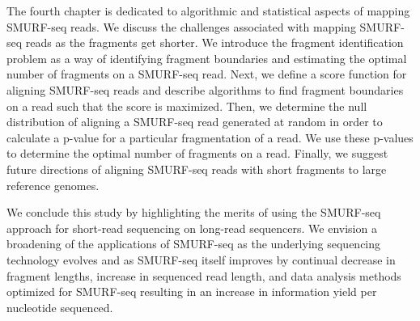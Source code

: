 The fourth chapter is dedicated to algorithmic and statistical aspects
of mapping SMURF-seq reads. We discuss the challenges associated with
mapping SMURF-seq reads as the fragments get shorter.
%
We introduce the fragment identification problem as a way of identifying
fragment boundaries and estimating the optimal number of fragments on a
SMURF-seq read.
%
Next, we define a score function for aligning SMURF-seq reads and
describe algorithms to find fragment boundaries on a read such that the
score is maximized.
%
Then, we determine the null distribution of aligning a SMURF-seq read
generated at random in order to calculate a p-value for a particular
fragmentation of a read. We use these p-values to determine the optimal
number of fragments on a read.
%
Finally, we suggest future directions of aligning SMURF-seq reads with
short fragments to large reference genomes.

We conclude this study by highlighting the merits of using the SMURF-seq
approach for short-read sequencing on long-read sequencers. We envision
a broadening of the applications of SMURF-seq as the underlying
sequencing technology evolves and as SMURF-seq itself improves by
continual decrease in fragment lengths, increase in sequenced read
length, and data analysis methods optimized for SMURF-seq resulting in
an increase in information yield per nucleotide sequenced.
